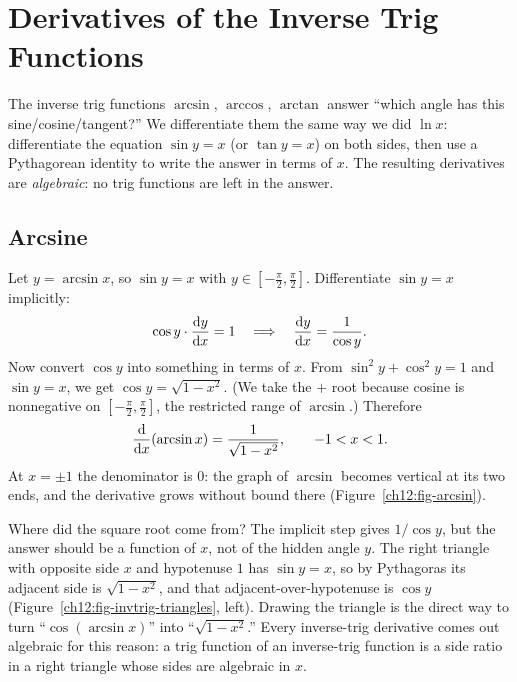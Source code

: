 \section{Derivatives of the Inverse Trig Functions}
\label{ch12:inverse-trig}

The inverse trig functions $\arcsin$, $\arccos$, $\arctan$ answer ``which
angle has this sine/cosine/tangent?'' We differentiate them the same way we
did $\ln x$: differentiate the equation $\sin y = x$ (or $\tan y = x$) on both
sides, then use a Pythagorean identity to write the answer in terms of $x$.
The resulting derivatives are \emph{algebraic}: no trig functions are left in
the answer.

\subsection{Arcsine}

Let $y = \arcsin x$, so $\sin y = x$ with $y\in[-\tfrac\pi2,\tfrac\pi2]$.
Differentiate $\sin y = x$ implicitly:
\[
   \cos y\cdot\frac{\mathrm{d} y}{\mathrm{d} x} = 1
   \quad\Longrightarrow\quad
   \frac{\mathrm{d} y}{\mathrm{d} x} = \frac{1}{\cos y}.
\]
Now convert $\cos y$ into something in terms of $x$. From
$\sin^2 y + \cos^2 y = 1$ and $\sin y = x$, we get
$\cos y = \sqrt{1-x^2}$. (We take the $+$ root because cosine is
nonnegative on $[-\tfrac\pi2,\tfrac\pi2]$, the restricted range of
$\arcsin$.) Therefore
\[
   \frac{\mathrm{d}}{\mathrm{d} x}\!\left(\arcsin x\right) = \frac{1}{\sqrt{1-x^2}},\qquad -1<x<1.
\]
At $x=\pm1$ the denominator is $0$: the graph of $\arcsin$ becomes vertical at
its two ends, and the derivative grows without bound there
(Figure~\ref{ch12:fig-arcsin}).


\begin{whybox}
Where did the square root come from? The implicit step gives
$1/\cos y$, but the answer should be a function of $x$, not of the hidden
angle $y$. The right triangle with opposite side $x$ and hypotenuse $1$ has
$\sin y = x$, so by Pythagoras its adjacent side is $\sqrt{1-x^2}$, and that
adjacent-over-hypotenuse is $\cos y$ (Figure~\ref{ch12:fig-invtrig-triangles},
left). Drawing the triangle is the direct way
to turn ``$\cos(\arcsin x)$'' into ``$\sqrt{1-x^2}$.'' Every inverse-trig
derivative comes out algebraic for this reason: a trig function of an
inverse-trig function is a side ratio in a right triangle whose sides are
algebraic in $x$.
\end{whybox}

